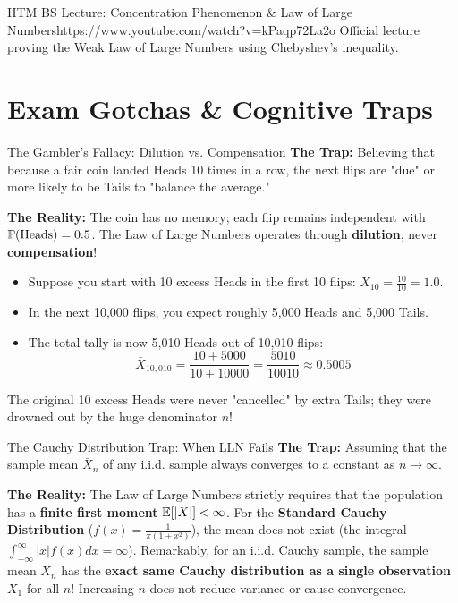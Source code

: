 \begin{videocard}{IITM BS Lecture: Concentration Phenomenon \& Law of Large Numbers}{https://www.youtube.com/watch?v=kPaqp72La2o}
Official lecture proving the Weak Law of Large Numbers using Chebyshev's inequality.
\end{videocard}

\section{Exam Gotchas \& Cognitive Traps}

\begin{trapbox}{The Gambler's Fallacy: Dilution vs. Compensation}
\textbf{The Trap:} Believing that because a fair coin landed Heads 10 times in a row, the next flips are "due" or more likely to be Tails to "balance the average."

\textbf{The Reality:} The coin has no memory; each flip remains independent with $\P(\text{Heads}) = 0.5$. The Law of Large Numbers operates through \textbf{dilution}, never \textbf{compensation}!
\begin{itemize}
    \item Suppose you start with 10 excess Heads in the first 10 flips: $\bar{X}_{10} = \frac{10}{10} = 1.0$.
    \item In the next 10,000 flips, you expect roughly 5,000 Heads and 5,000 Tails.
    \item The total tally is now 5,010 Heads out of 10,010 flips:
    $$\bar{X}_{10,010} = \frac{10 + 5000}{10 + 10000} = \frac{5010}{10010} \approx 0.5005$$
\end{itemize}
The original 10 excess Heads were never "cancelled" by extra Tails; they were drowned out by the huge denominator $n$!
\end{trapbox}

\begin{trapbox}{The Cauchy Distribution Trap: When LLN Fails}
\textbf{The Trap:} Assuming that the sample mean $\bar{X}_n$ of any i.i.d. sample always converges to a constant as $n \to \infty$.

\textbf{The Reality:} The Law of Large Numbers strictly requires that the population has a \textbf{finite first moment} $\E[|X|] < \infty$.
For the \textbf{Standard Cauchy Distribution} ($f(x) = \frac{1}{\pi(1+x^2)}$), the mean does not exist (the integral $\int_{-\infty}^\infty |x| f(x) dx = \infty$).
Remarkably, for an i.i.d. Cauchy sample, the sample mean $\bar{X}_n$ has the \textbf{exact same Cauchy distribution as a single observation $X_1$} for all $n$! Increasing $n$ does not reduce variance or cause convergence.
\end{trapbox}

